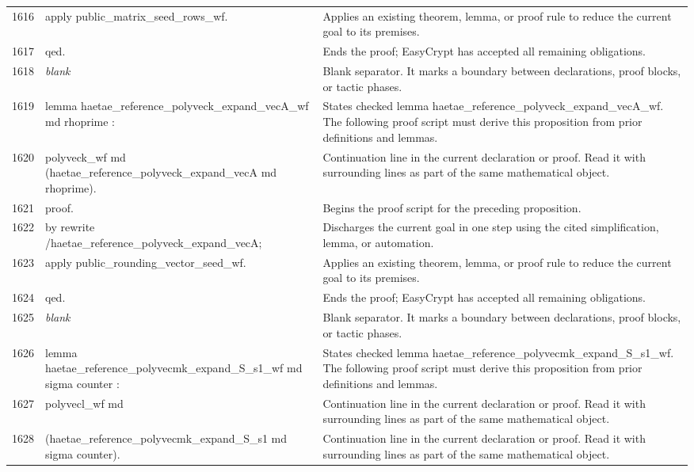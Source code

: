 \documentclass[10pt]{article}
\begin{document}
\begin{longtable}{r L{0.53\textwidth} L{0.37\textwidth}}
1616 & {\ttfamily\scriptsize    apply public\_matrix\_seed\_rows\_wf.} & Applies an existing theorem, lemma, or proof rule to reduce the current goal to its premises. \\
1617 & {\ttfamily\scriptsize qed.} & Ends the proof; EasyCrypt has accepted all remaining obligations. \\
1618 & {\ttfamily\scriptsize \emph{blank}} & Blank separator.  It marks a boundary between declarations, proof blocks, or tactic phases. \\
1619 & {\ttfamily\scriptsize lemma haetae\_reference\_polyveck\_expand\_vecA\_wf md rhoprime :} & States checked lemma haetae\_reference\_polyveck\_expand\_vecA\_wf.  The following proof script must derive this proposition from prior definitions and lemmas. \\
1620 & {\ttfamily\scriptsize   polyveck\_wf md (haetae\_reference\_polyveck\_expand\_vecA md rhoprime).} & Continuation line in the current declaration or proof.  Read it with surrounding lines as part of the same mathematical object. \\
1621 & {\ttfamily\scriptsize proof.} & Begins the proof script for the preceding proposition. \\
1622 & {\ttfamily\scriptsize by rewrite /haetae\_reference\_polyveck\_expand\_vecA;} & Discharges the current goal in one step using the cited simplification, lemma, or automation. \\
1623 & {\ttfamily\scriptsize    apply public\_rounding\_vector\_seed\_wf.} & Applies an existing theorem, lemma, or proof rule to reduce the current goal to its premises. \\
1624 & {\ttfamily\scriptsize qed.} & Ends the proof; EasyCrypt has accepted all remaining obligations. \\
1625 & {\ttfamily\scriptsize \emph{blank}} & Blank separator.  It marks a boundary between declarations, proof blocks, or tactic phases. \\
1626 & {\ttfamily\scriptsize lemma haetae\_reference\_polyvecmk\_expand\_S\_s1\_wf md sigma counter :} & States checked lemma haetae\_reference\_polyvecmk\_expand\_S\_s1\_wf.  The following proof script must derive this proposition from prior definitions and lemmas. \\
1627 & {\ttfamily\scriptsize   polyvecl\_wf md} & Continuation line in the current declaration or proof.  Read it with surrounding lines as part of the same mathematical object. \\
1628 & {\ttfamily\scriptsize     (haetae\_reference\_polyvecmk\_expand\_S\_s1 md sigma counter).} & Continuation line in the current declaration or proof.  Read it with surrounding lines as part of the same mathematical object. \\

\end{longtable}
\end{document}
